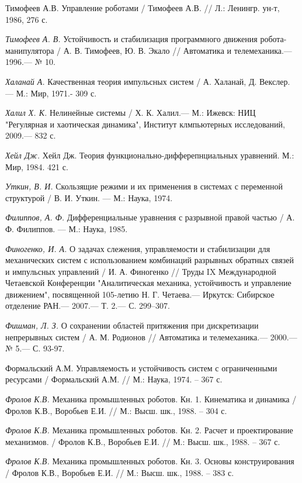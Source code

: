 \begin{thebibliography}{10}
	Тимофеев А.В. Управление роботами / Тимофеев А.В. // Л.: Ленингр. ун-т, 1986, 276 с.
	
	{\it Тимофеев А. В.} Устойчивость и стабилизация программного движения робота-манипулятора /
	А. В. Тимофеев, Ю. В. Экало // Автоматика и телемеханика.— 1996.— № 10.
	
	{\it Халанай А.} Качественная теория импульсных систем /
	А. Халанай, Д. Векслер. — М.: Мир, 1971.- 309 с.
	
	{\it Халил Х. К.} Нелинейные системы / Х. К. Халил.— М.: Ижевск: НИЦ "Регулярная и хаотическая динамика", Институт клмпьютерных исследований, 2009.— 832 с.
	
	{\it Хейл Дж.} Хейл Дж. Теория функционально-дифферепнциальных уравнений. М.: Мир,
	1984. 421 с.
	
	{\it Уткин, В. И.} Скользящие режими и их применения в системах с переменной структурой /
	В. И. Уткин. — М.: Наука, 1974.
	
	{\it Филиппов, А. Ф.} Дифференциальные уравнения с разрывной правой частью /
	А. Ф. Филиппов. — М.: Наука, 1985.
	
	{\it Финогенко, И. А.} О задачах слежения, управляемости и стабилизации для механических систем с использованием комбинаций разрывных обратных связей и импульсных управлений /
	И. А. Финогенко // Труды IX Международной Четаевской Конференции "Аналитическая механика, устойчивость и управление движением", посвященной 105-летию Н. Г. Четаева.— Иркутск: Сибирское отделение РАН.— 2007.— Т. 2.— С. 299–307.
	
	{\it Фишман, Л. З.} О сохранении областей притяжения при дискретизации непрерывных систем
	/ А. М. Родионов // Автоматика и телемеханика.— 2000.— № 5.— С. 93-97.
	
	Формальский А.М. Управляемость и устойчивость систем с ограниченными ресурсами / Формальский А.М. // М.: Наука, 1974. – 367 с.
	
	{\it Фролов К.В.} Механика промышленных роботов. Кн. 1. Кинематика и динамика / Фролов К.В., Воробьев Е.И. // М.: Высш. шк., 1988. – 304 с.
	
	{\it Фролов К.В.} Механика промышленных роботов. Кн. 2. Расчет и проектирование механизмов. / Фролов К.В., Воробьев Е.И. // М.: Высш. шк., 1988. – 367 с.
	
	{\it Фролов К.В.} Механика промышленных роботов. Кн. 3. Основы конструирования / Фролов К.В., Воробьев Е.И. // М.: Высш. шк., 1988. – 383 с.
	

\end{thebibliography}
